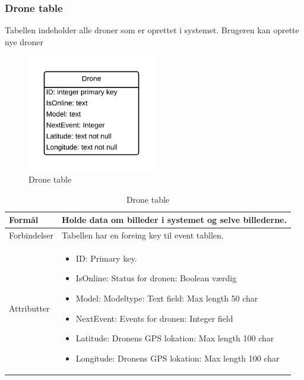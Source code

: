 \subsubsection{Drone table}
Tabellen indeholder alle droner som er oprettet i systemet. Brugeren kan oprette nye droner
\vspace{-5pt}
\begin{figure}[H]
	\centering
	\includegraphics[width=0.5\textwidth]{Billeder/database/DroneTable.png}
	\vspace{-5pt}
	\caption{Drone table}
	\label{fig:drone_table}
\end{figure}

\begin{table}[H]
\begin{tabular}{| p{3cm}| p{11.5cm}|}
\hline

Formål	 							& Holde data om billeder i systemet og selve billederne.\\\hline
Forbindelser						& Tabellen har en foreing key til event tabllen.\\\hline
Attributter						& \begin{itemize}
												\item ID: Primary key.
												\item IsOnline: Status for dronen: Boolean værdig
												\item Model: Modeltype: Text field: Max length 50 char
												\item NextEvent: Events for dronen: Integer field
												\item Latitude: Dronens GPS lokation: Max length 100 char  
												\item Longitude: Dronens GPS lokation: Max length 100 char
											\end{itemize} \\\hline 
\end{tabular}
\caption{Drone table}
\label{tab:drone_table}
\end{table}